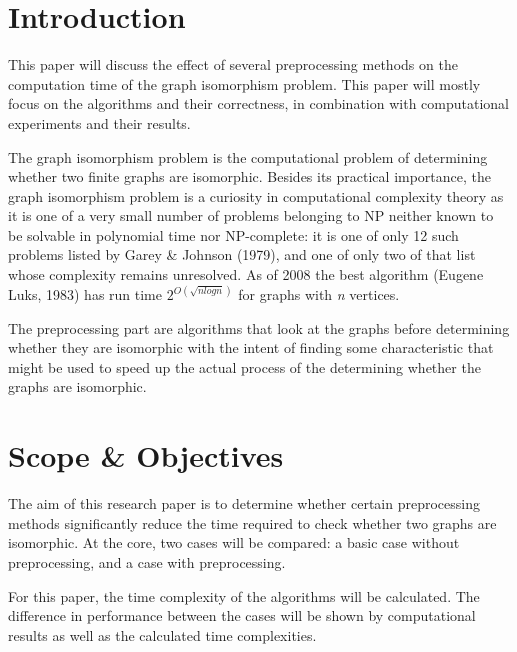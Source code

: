 \documentclass[twoside]{article}
\theoremstyle{definition}
\theoremstyle{plain}
\begin{document}
\begin{multicols}{2} %

\section{Introduction} 

This paper will discuss the effect of several preprocessing methods on the computation time of the graph isomorphism problem. This paper will mostly focus on the algorithms and their correctness, in combination with computational experiments and their results.

The graph isomorphism problem is the computational problem of determining whether two finite graphs are isomorphic. Besides its practical importance, the graph isomorphism problem is a curiosity in computational complexity theory as it is one of a very small number of problems belonging to NP neither known to be solvable in polynomial time nor NP-complete: it is one of only 12 such problems listed by Garey \& Johnson (1979)\cite{book:garyJohnson1979}, and one of only two of that list whose complexity remains unresolved. As of 2008 the best algorithm (Eugene Luks, 1983) has run time $2^{O(\sqrt{n log n})}$ for graphs with \emph{n} vertices.\cite{article:davidJohnson2005}\cite{inproceedings:babaiCodenotti2008}\cite{website:wikiGI}

The preprocessing part are algorithms that look at the graphs before determining whether they are isomorphic with the intent of finding some characteristic that might be used to speed up the actual process of the determining whether the graphs are isomorphic.


\section{Scope \& Objectives}

The aim of this research paper is to determine whether certain preprocessing methods significantly reduce the time required to check whether two graphs are isomorphic. At the core, two cases will be compared: a basic case without preprocessing, and a case with preprocessing. 

For this paper, the time complexity of the algorithms will be calculated. The difference in performance between the cases will be shown by computational results as well as the calculated time complexities.


\end{multicols}
\end{document}
